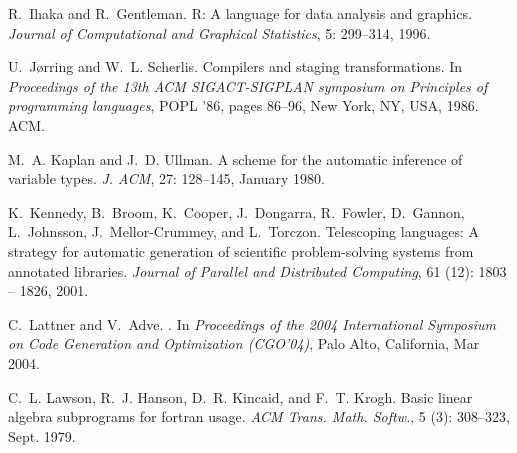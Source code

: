 \documentclass[9pt]{sigplanconf}
\begin{document}
\begin{thebibliography}{42}
R.~Ihaka and R.~Gentleman.
\newblock R: A language for data analysis and graphics.
\newblock \emph{Journal of Computational and Graphical Statistics}, 5:
  299--314, 1996.

U.~J{\o}rring and W.~L. Scherlis.
\newblock Compilers and staging transformations.
\newblock In \emph{Proceedings of the 13th ACM SIGACT-SIGPLAN symposium on
  Principles of programming languages}, POPL '86, pages 86--96, New York, NY,
  USA, 1986. ACM.

M.~A. Kaplan and J.~D. Ullman.
\newblock A scheme for the automatic inference of variable types.
\newblock \emph{J. ACM}, 27: 128--145, January 1980.

K.~Kennedy, B.~Broom, K.~Cooper, J.~Dongarra, R.~Fowler, D.~Gannon,
  L.~Johnsson, J.~Mellor-Crummey, and L.~Torczon.
\newblock Telescoping languages: A strategy for automatic generation of
  scientific problem-solving systems from annotated libraries.
\newblock \emph{Journal of Parallel and Distributed Computing}, 61
  (12): 1803 -- 1826, 2001.

C.~Lattner and V.~Adve.
.
\newblock In \emph{{Proceedings of the 2004 International Symposium on Code
  Generation and Optimization (CGO'04)}}, Palo Alto, California, Mar 2004.

C.~L. Lawson, R.~J. Hanson, D.~R. Kincaid, and F.~T. Krogh.
\newblock Basic linear algebra subprograms for fortran usage.
\newblock \emph{ACM Trans. Math. Softw.}, 5 (3): 308--323,
  Sept. 1979.


\end{thebibliography}
\end{document}

